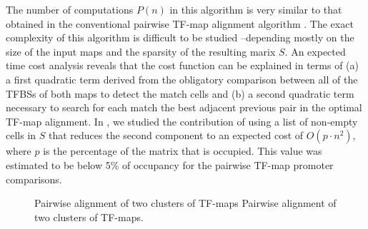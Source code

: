 The number of computations $P(n)$ in this algorithm is very similar
to that obtained in the conventional pairwise TF-map alignment algorithm
\citep{blanco:2006b}. The exact complexity of this algorithm is
difficult to be studied --depending mostly on the size of the input maps
and the sparsity of the resulting marix $S$. An expected time cost
analysis reveals that the cost function can be explained in terms of (a)
a first quadratic term derived from the obligatory comparison between all
of the TFBSs of both maps to detect the match cells and (b) a second
quadratic term necessary to search for each match the best adjacent previous
pair in the optimal TF-map alignment. In \citep{blanco:2006b}, we studied
the contribution of using a list of non-empty cells in $S$ that
reduces the second component to an expected cost of $O(p \cdot n^2)$, where $p$ is
the percentage of the matrix that is occupied. This value was estimated to be 
below 5\% of occupancy for the pairwise TF-map promoter comparisons.


\begin{figure}[t!]
\begin{center}
          {Pairwise alignment of two clusters of TF-maps}%
          {Pairwise alignment of two clusters of TF-maps.}%
          {}
\end{center}
\end{figure}

